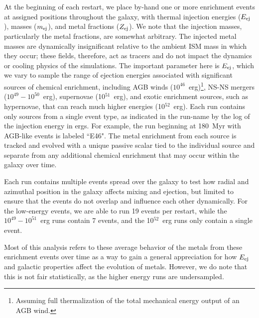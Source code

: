 At the beginning of each restart, we place by-hand one or more enrichment events at assigned positions throughout the galaxy, with thermal injection energies ($E_{\rm ej}$), masses ($m_{\rm ej}$), and metal fractions ($Z_{\rm ej}$). We note that the injection masses, particularly the metal fractions, are somewhat arbitrary. The injected metal masses are dynamically insignificant relative to the ambient ISM mass in which they occur; these fields, therefore, act as tracers and do not impact the dynamics or cooling physics of the simulations. The important parameter here is $E_{\rm ej}$, which we vary to sample the range of ejection energies associated with significant sources of chemical enrichment, including AGB winds ($10^{46}$~erg)\footnote{Assuming full thermalization of the total mechanical energy output of an AGB wind.}, NS-NS mergers ($10^{49} - 10^{50}$~erg), supernovae (10$^{51}$~erg), and exotic enrichment sources, such as hypernovae, that can reach much higher energies (10$^{52}$~erg). Each run contains only sources from a single event type, as indicated in the run-name by the log of the injection energy in ergs. For example, the run beginning at 180~Myr with AGB-like events is labeled ``\runone E46". The metal enrichment from each source is tracked and evolved with a unique passive scalar tied to the individual source and separate from any additional chemical enrichment that may occur within the galaxy over time.

Each run contains multiple events spread over the galaxy to test how radial and azimuthal position in the galaxy affects mixing and ejection, but limited to ensure that the events do not overlap and influence each other dynamically. For the low-energy events, we are able to run 19 events per restart, while the $10^{49}-10^{51}$~erg runs contain 7 events, and the 10$^{52}$~erg runs only contain a single event.

Most of this analysis refers to these average behavior of the metals from these enrichment events over time as a way to gain a general appreciation for how $E_{\rm ej}$ and galactic properties affect the evolution of metals. However, we do note that this is not fair statistically, as the higher energy runs are undersampled.



